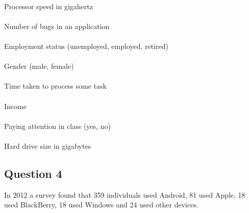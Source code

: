 \documentclass[12pt]{article}
\begin{document}
\hspace{-1.8cm}{\bf c.}\vspace{-0.5cm}\\
Processor speed in gigahertz\\[-0.3cm]


\hspace{-1.8cm}{\bf d.}\vspace{-0.5cm}\\
Number of bugs in an application\\[-0.3cm]

\hspace{-1.8cm}{\bf e.}\vspace{-0.5cm}\\
Employment status (unemployed, employed, retired)\\[-0.3cm]

\hspace{-1.8cm}{\bf f.}\vspace{-0.5cm}\\
Gender (male, female)\\[-0.3cm]

\hspace{-1.8cm}{\bf g.}\vspace{-0.5cm}\\
Time taken to process some task\\[-0.3cm]

\hspace{-1.8cm}{\bf h.}\vspace{-0.5cm}\\
Income\\[-0.3cm]

\hspace{-1.8cm}{\bf i.}\vspace{-0.5cm}\\
Paying attention in class (yes, no)\\[-0.3cm]

\hspace{-1.8cm}{\bf j.}\vspace{-0.5cm}\\
Hard drive size in gigabytes\\[-0.3cm]

\subsection*{Question 4}
In 2012 a survey found that 359 individuals used Android, 81 used Apple, 18 used BlackBerry, 18 used Windows and 24 used other devices.\\
\end{document}
